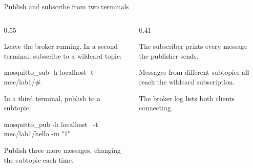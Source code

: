 \documentclass[10pt,aspectratio=169,t]{beamer}
\begin{document}
\begin{frame}[fragile,eyebrow=Task IV]{Publish and subscribe from two terminals}
  \begin{columns}[T]
    \begin{column}{0.55\textwidth}
      \begin{steps}
        \item Leave the broker running. In a second terminal, subscribe to a wildcard topic:
\begin{shell}
mosquitto_sub -h localhost -t mec/lab1/#
\end{shell}
        \item In a third terminal, publish to a subtopic:
\begin{shell}
mosquitto_pub -h localhost \
  -t mec/lab1/hello -m "1"
\end{shell}
        \item Publish three more messages, changing the subtopic each time.
      \end{steps}
    \end{column}
    \begin{column}{0.41\textwidth}
      \begin{checklist}
        \item The subscriber prints every message the publisher sends.
        \item Messages from different subtopics all reach the wildcard subscription.
        \item The broker log lists both clients connecting.
      \end{checklist}
    \end{column}
  \end{columns}
\end{frame}
\end{document}
